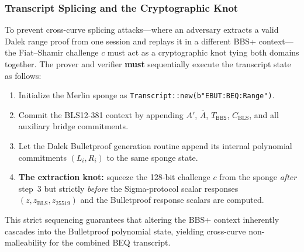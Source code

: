 \documentclass[11pt]{article}
\theoremstyle{definitionstyle}
\theoremstyle{plain}
\begin{document}
\subsubsection{Transcript Splicing and the Cryptographic Knot}
To prevent cross-curve splicing attacks---where an adversary extracts a valid Dalek range proof from one session and replays it in a different BBS+ context---the Fiat--Shamir challenge $c$ must act as a cryptographic knot tying both domains together. The prover and verifier \textbf{must} sequentially execute the transcript state as follows:
\begin{enumerate}[leftmargin=*]
\item Initialize the Merlin sponge as \texttt{Transcript::new(b"EBUT:BEQ:Range")}. 
\item Commit the BLS12-381 context by appending $A'$, $\bar{A}$, $T_{\mathsf{BBS}}$, $C_{\text{BLS}}$, and all auxiliary bridge commitments.
\item Let the Dalek Bulletproof generation routine append its internal polynomial commitments $(L_i,R_i)$ to the same sponge state.
\item \textbf{The extraction knot:} squeeze the 128-bit challenge $c$ from the sponge \emph{after} step~3 but strictly \emph{before} the Sigma-protocol scalar responses $(z, z_{\text{BLS}}, z_{25519})$ and the Bulletproof response scalars are computed.
\end{enumerate}
This strict sequencing guarantees that altering the BBS+ context inherently cascades into the Bulletproof polynomial state, yielding cross-curve non-malleability for the combined BEQ transcript.
\end{document}
